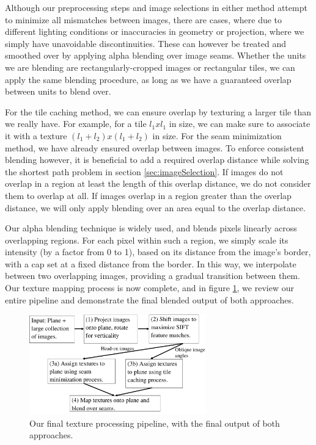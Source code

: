 \documentclass[10pt,twocolumn,letterpaper]{article}
\begin{document}
Although our preprocessing steps and image selections in either method
attempt to minimize all mismatches between images, there are cases,
where due to different lighting conditions or inaccuracies in geometry
or projection, where we simply have unavoidable discontinuities. These
can however be treated and smoothed over by applying alpha blending
over image seams.  Whether the units we are blending are
rectangularly-cropped images or rectangular tiles, we can apply the
same blending procedure, as long as we have a guaranteed overlap
between units to blend over.

For the tile caching method, we can ensure overlap by texturing a
larger tile than we really have. For example, for a tile $l_1 x l_1$
in size, we can make sure to associate it with a texture $(l_1 + l_2)
x (l_1 + l_2)$ in size. For the seam minimization method, we have
already ensured overlap between images. To enforce consistent blending
however, it is beneficial to add a required overlap distance while
solving the shortest path problem in section
\ref{sec:imageSelection}. If images do not overlap in a region at
least the length of this overlap distance, we do not consider them to
overlap at all. If images overlap in a region greater than the overlap
distance, we will only apply blending over an area equal to the
overlap distance.

Our alpha blending technique is widely used, and blends pixels
linearly across overlapping regions. For each pixel within such a
region, we simply scale its intensity (by a factor from 0 to 1), based
on its distance from the image's border, with a cap set at a fixed
distance from the border. In this way, we interpolate between two
overlapping images, providing a gradual transition between them. Our
texture mapping process is now complete, and in figure
\ref{fig:pipeline}, we review our entire pipeline and demonstrate the
final blended output of both approaches.

\begin{figure}
  \centering
  \includegraphics[width=3in]{pipeline.pdf}
  \caption{Our final texture processing pipeline, with the final
    output of both approaches.}
  \label{fig:pipeline}
\end{figure}
\end{document}
